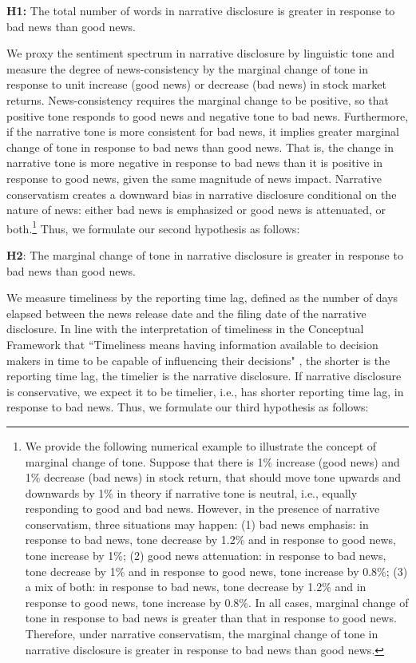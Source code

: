 \documentclass[a4paper]{article}
\begin{document}
\begin{spacing}{2}
\begin{center}
	\textbf{H1:} The total number of words in narrative disclosure is greater in response to bad news than good news.
\end{center}

We proxy the sentiment spectrum in narrative disclosure by linguistic tone and measure the degree of news-consistency by the marginal change of tone in response to unit increase (good news) or decrease (bad news) in stock market returns. News-consistency requires the marginal change to be positive, so that positive tone responds to good news and negative tone to bad news. Furthermore, if the narrative tone is more consistent for bad news, it implies greater marginal change of tone in response to bad news than good news. That is, the change in narrative tone is more negative in response to bad news than it is positive in response to good news, given the same magnitude of news impact. Narrative conservatism creates a downward bias in narrative disclosure conditional on the nature of news: either bad news is emphasized or good news is attenuated, or both.\footnote{We provide the following numerical example to illustrate the concept of marginal change of tone. Suppose that there is 1\% increase (good news) and 1\% decrease (bad news) in stock return, that should move tone upwards and downwards by 1\% in theory if narrative tone is neutral, i.e., equally responding to good and bad news. However, in the presence of narrative conservatism, three situations may happen: (1) bad news emphasis: in response to bad news, tone decrease by 1.2\% and in response to good news, tone increase by 1\%; (2) good news attenuation: in response to bad news, tone decrease by 1\% and in response to good news, tone increase by 0.8\%; (3) a mix of both: in response to bad news, tone decrease by 1.2\% and in response to good news, tone increase by 0.8\%. In all cases, marginal change of tone in response to bad news is greater than that in response to good news. Therefore, under narrative conservatism, the marginal change of tone in narrative disclosure is greater in response to bad news than good news.} Thus, we formulate our second hypothesis as follows:
\begin{center}
	\textbf{H2}: The marginal change of tone in narrative disclosure is greater in response to bad news than good news.
\end{center}

We measure timeliness by the reporting time lag, defined as the number of days elapsed between the news release date and the filing date of the narrative disclosure. In line with the interpretation of timeliness in the Conceptual Framework that ``Timeliness means having information available to decision makers in time to be capable of influencing their decisions" , the shorter is the reporting time lag, the timelier is the narrative disclosure. If narrative disclosure is conservative, we expect it to be timelier, i.e., has shorter reporting time lag, in response to bad news. Thus, we formulate our third hypothesis as follows:


\end{spacing}
\end{document}
